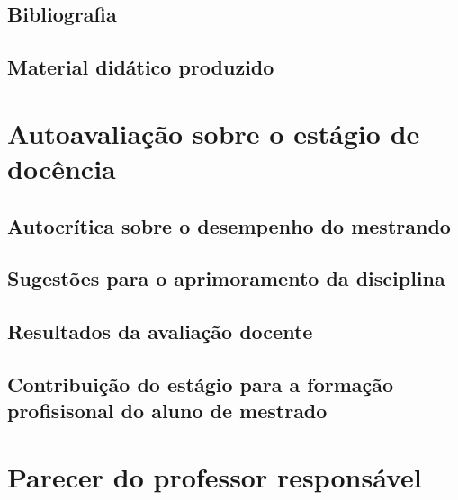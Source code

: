 \documentclass[
	12pt,				%
	openright,			%
	oneside,			%
	a4paper,			%
	chapter=TITLE,		%
	section=TITLE,		%
	english,			%
	french,				%
	spanish,			%
	brazil				%
	]{abntex2}
\begin{document}
\section{Bibliografia}

\section{Material didático produzido}


\newpage
\chapter{Autoavaliação sobre o estágio de docência}

\section{Autocrítica sobre o desempenho do mestrando}

\section{Sugestões para o aprimoramento da disciplina}

\section{Resultados da avaliação docente}

\section{Contribuição do estágio para a formação profisisonal do aluno de mestrado}


\newpage
\chapter{Parecer do professor responsável}

\postextual
\newpage
\pagestyle{empty}


%
%
\end{document}
